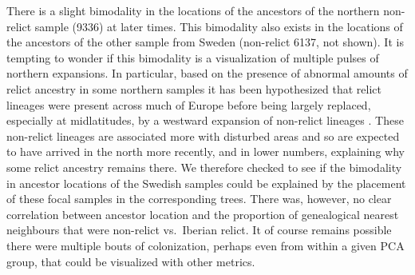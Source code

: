 \documentclass[12pt]{article}
\begin{document}
There is a slight bimodality in the locations of the ancestors of the northern non-relict sample (9336) at later times.
This bimodality also exists in the locations of the ancestors of the other sample from Sweden (non-relict 6137, not shown).
It is tempting to wonder if this bimodality is a visualization of multiple pulses of northern expansions.
In particular, based on the presence of abnormal amounts of relict ancestry in some northern samples it has been hypothesized that relict lineages were present across much of Europe before being largely replaced, especially at midlatitudes, by a westward expansion of non-relict lineages \citep{lee2017post,hsu2019postglacial}. 
These non-relict lineages are associated more with disturbed areas and so are expected to have arrived in the north more recently, and in lower numbers, explaining why some relict ancestry remains there.
We therefore checked to see if the bimodality in ancestor locations of the Swedish samples could be explained by the placement of these focal samples in the corresponding trees.  
There was, however, no clear correlation between ancestor location and the proportion of genealogical nearest neighbours that were non-relict vs.\ Iberian relict.
It of course remains possible there were multiple bouts of colonization, perhaps even from within a given PCA group, that could be visualized with other metrics.

\end{document}
